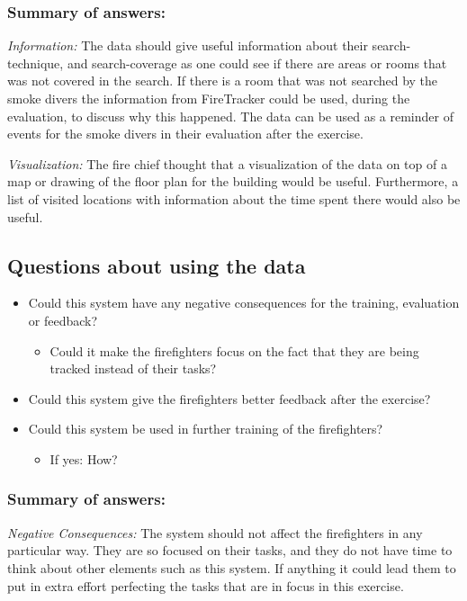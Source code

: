 \documentclass[../Main/thesis.tex]{subfiles}
\begin{document}
\subsubsection*{Summary of answers:}
\textit{Information:}
The data should give useful information about their search-technique, and search-coverage as one could see if there are areas or rooms that was not covered in the search.
If there is a room that was not searched by the smoke divers the information from FireTracker could be used, during the evaluation, to discuss why this happened.
The data can be used as a reminder of events for the smoke divers in their evaluation after the exercise.

\textit{Visualization:}
The fire chief thought that a visualization of the data on top of a map or drawing of the floor plan for the building would be useful.
Furthermore, a list of visited locations with information about the time spent there would also be useful.

\subsection{Questions about using the data}
\begin{itemize}
	\item Could this system have any negative consequences for the training, evaluation or feedback?
	\begin{itemize}
		\item Could it make the firefighters focus on the fact that they are being tracked instead of their tasks?
	\end{itemize}
	\item Could this system give the firefighters better feedback after the exercise?
	\item Could this system be used in further training of the firefighters?
	\begin{itemize}
		\item If yes: How?
	\end{itemize}
\end{itemize}

\subsubsection*{Summary of answers:}
\textit{Negative Consequences:}
The system should not affect the firefighters in any particular way.
They are so focused on their tasks, and they do not have time to think about other elements such as this system.
If anything it could lead them to put in extra effort perfecting the tasks that are in focus in this exercise.
\end{document}
